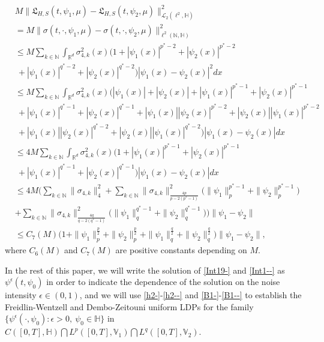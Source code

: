 \documentclass[11pt]{article}
\renewcommand{\leq}{\leqslant}
\numberwithin{equation}{section}
\begin{document}
\begin{align}\label{B1--}
&M\|\mathfrak{L}_{H,S}(t,\psi_1,\mu)-
\mathfrak{L}_{H,S}(t,\psi_2,\mu)
\|^2_{\mathcal{L}_2(\ell^2
,\mathbb{H})}\nonumber\\&=M\|\sigma(t,\cdot,\psi_1,\mu)-
\sigma(t,\cdot,\psi_2,\mu)
\|^2_{
\ell^2(\mathbb{N},\mathbb{H})}
\nonumber\\&\leq M\sum_{k\in\mathbb{N}}\int_{\mathbb{R}^d}
\sigma^2_{4,k}(x)\big(1+ |\psi_1(x)|^{p^*-2}+ |\psi_2(x)|^{p^*-2} \nonumber\\& \ +|\psi_1(x)|^{q^*-2}
+|\psi_2(x)|^{q^*-2}
\big)|\psi_1(x)-\psi_2(x)|^2 dx
\nonumber\\&\leq
M\sum_{k\in\mathbb{N}}\int_{\mathbb{R}^d}
\sigma^2_{4,k}(x)
\big(|\psi_1(x)|+
|\psi_2(x)|
+ |\psi_1(x)|^{p^*-1}+ |\psi_2(x)|^{p^*-1} \nonumber\\& \ +|\psi_1(x)|^{q^*-1}
  +|\psi_2(x)|^{q^*-1}
 +|\psi_1(x)||\psi_2(x)|^{p^*-2}+
|\psi_2(x)||\psi_1(x)|^{p^*-2}
\nonumber\\& \ +|\psi_1(x)||\psi_2(x)|^{q^*-2}
 +
|\psi_2(x)||\psi_1(x)|^{q^*-2}
\big)|\psi_1(x)-\psi_2(x)|dx
\nonumber\\&\leq
4M\sum_{k\in\mathbb{N}}\int_{\mathbb{R}^d}
\sigma^2_{4,k}(x)
\big(1
+  |\psi_1(x)|^{p^*-1}+ |\psi_2(x)|^{p^*-1} \nonumber\\& \ +|\psi_1(x)|^{q^*-1}
 +|\psi_2(x)|^{q^*-1}
\big)|\psi_1(x)-\psi_2(x)| dx
\nonumber\\&\leq 4M
\bigg(  \sum_{k\in\mathbb{N}}\|\sigma_{4,k}
\|^{2}_{4} +\sum_{k\in\mathbb{N}}\|\sigma_{4,k} \|^2
 _{\frac{4p}{p-2(p^*-1)}}\Big(\|\psi_1\|_p^{p^*-1}
+\|\psi_2\|_p^{p^*-1} \Big)\nonumber\\&+
 \sum_{k\in\mathbb{N}}\|\sigma_{4,k} \|^2
 _{\frac{4q}{q-2(q^*-1)}}\Big(\|\psi_1\|_q^{q^*-1}
+\|\psi_2\|_q^{q^*-1} \Big)
     \bigg)
 \|\psi_1-\psi_2\|
\nonumber\\&\leq C_7(M)
\Big(1+\|\psi_1\|_p^{\frac{p}{2}}
+\|\psi_2\|_p^{\frac{p}{2}}
+\|\psi_1\|_q^{\frac{q}{2}}
 +\|\psi_2\|_q^{\frac{q}{2}}
   \Big)\|\psi_1-\psi_2\|,
\end{align}
where $C_6(M)$ and $C_7(M)$ are positive constants
depending on $M$.


In the rest of this paper, we will write the solution of \eqref{Int19-} and \eqref{Int1--} as  $\psi^\epsilon(t,\psi_0)$ in order to indicate  the dependence of the solution on the noise intensity $\epsilon\in(0,1)$, and we will use
  \eqref{h2-}-\eqref{h2--}
and \eqref{B1-}-\eqref{B1--} to establish the
Freidlin-Wentzell and Dembo-Zeitouni uniform LDPs for the family $\{\psi^\epsilon(\cdot,\psi_0): \epsilon>0,\ \psi_0\in \mathbb{H}\}$
  in $C([0,T],\mathbb{H} )\bigcap L^p([0,T], \mathbb{V}_1  )\bigcap L^q([0,T], \mathbb{V}_2)$.
\end{document}
